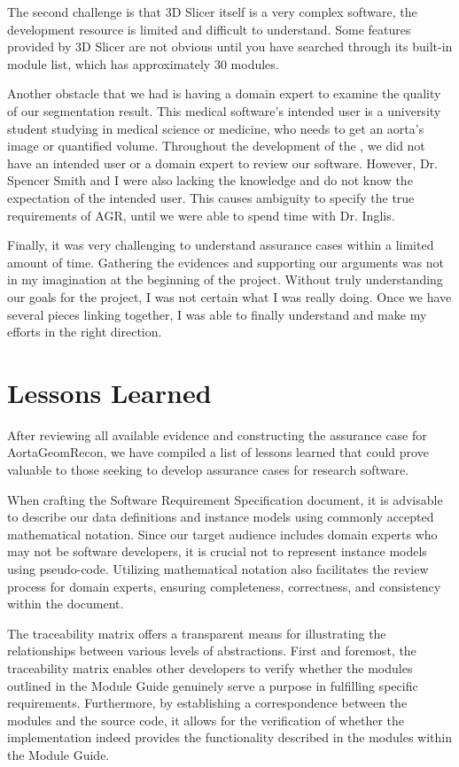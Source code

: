 The second challenge is that 3D Slicer itself is a very complex software, the development resource is limited and difficult to understand. Some features provided by 3D Slicer are not obvious until you have searched through its built-in module list, which has approximately 30 modules.

Another obstacle that we had is having a domain expert to examine the quality of our segmentation result. This medical software's intended user is a university student studying in medical science or medicine, who needs to get an aorta's image or quantified volume. Throughout the development of the \progname{}, we did not have an intended user or a domain expert to review our software. However, Dr. Spencer Smith and I were also lacking the knowledge and do not know the expectation of the intended user. This causes ambiguity to specify the true requirements of AGR, until we were able to spend time with Dr. Inglis.

Finally, it was very challenging to understand assurance cases within a limited amount of time. Gathering the evidences and supporting our arguments was not in my imagination at the beginning of the project. Without truly understanding our goals for the project, I was not certain what I was really doing. Once we have several pieces linking together, I was able to finally understand and make my efforts in the right direction. 

\section{Lessons Learned}\label{ll}
After reviewing all available evidence and constructing the assurance case for AortaGeomRecon, we have compiled a list of lessons learned that could prove valuable to those seeking to develop assurance cases for research software.

When crafting the Software Requirement Specification document, it is advisable to describe our data definitions and instance models using commonly accepted mathematical notation. Since our target audience includes domain experts who may not be software developers, it is crucial not to represent instance models using pseudo-code. Utilizing mathematical notation also facilitates the review process for domain experts, ensuring completeness, correctness, and consistency within the document.

The traceability matrix offers a transparent means for illustrating the relationships between various levels of abstractions. First and foremost, the traceability matrix enables other developers to verify whether the modules outlined in the Module Guide genuinely serve a purpose in fulfilling specific requirements. Furthermore, by establishing a correspondence between the modules and the source code, it allows for the verification of whether the implementation indeed provides the functionality described in the modules within the Module Guide.


